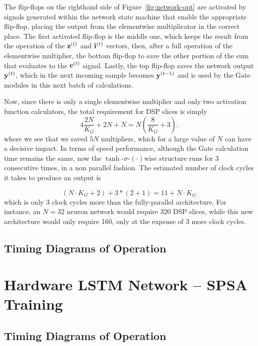 The flip-flops on the righthand side of Figure~\ref{fig:network-opt} are activated by signals generated within the network state machine that enable the appropriate flip-flop, placing the output from the elementwise multiplicator in the correct place. The first activated flip-flop is the middle one, which keeps the result from the operation of the $\mathbf{z}^{(t)}$ and $\mathbf{i}^{(t)}$ vectors, then, after a full operation of the elementwise multiplier, the bottom flip-flop to save the other portion of the sum that evaluates to the $\mathbf{c}^{(t)}$ signal. Lastly, the top flip-flop saves the network output $\mathbf{y}^{(t)}$, which in the next incoming sample becomes $\mathbf{y}^{(t-1)}$ and is used by the Gate modules in this next batch of calculations.

Now, since there is only a single elementwise multiplier and only two activation function calculators, the total requirement for DSP slices is simply
\begin{equation}\label{eq:numdsp_network-opt}
    4\frac{2N}{K_G} + 2N + N = N \left( \frac{8}{K_G} + 3 \right).
\end{equation}
where we see that we saved $5N$ multipliers, which for a large value of $N$ can have a decisive impact. In terms of speed performance, although the Gate calculation time remains the same, now the $\tanh$-$\sigma$-$(\cdot)$wise structure runs for 3 consecutive times, in a non parallel fashion. The estimated number of clock cycles it takes to produce an output is

\begin{equation}\label{eq:numcc_network-opt}
    (N \cdot K_G + 2) + 3*(2 + 1)  = 11 + N\cdot K_G
\end{equation}
which is only 3 clock cycles more than the fully-parallel architecture. For instance, an $N=32$ neuron network would require 320 DSP slices, while this new architecture would only require 160, only at the expense of 3 more clock cycles.

\subsection{Timing Diagrams of Operation}

\section{Hardware LSTM Network -- SPSA Training}

\subsection{Timing Diagrams of Operation}
